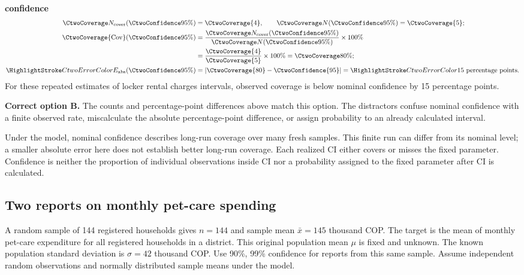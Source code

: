 \textbf{ confidence}\nopagebreak[4]
\begin{align*}
\CtwoCoverCount(\CtwoConfidence{95\%})&=\CtwoCoverage{4},
\qquad\CtwoTotalCount(\CtwoConfidence{95\%})=\CtwoCoverage{5};\\
\CtwoCoverage{\mathrm{Cov}}(\CtwoConfidence{95\%})
&=\frac{\CtwoCoverCount(\CtwoConfidence{95\%})}{\CtwoTotalCount(\CtwoConfidence{95\%})}\times100\%
\\
&=\frac{\CtwoCoverage{4}}{\CtwoCoverage{5}}\times100\%=\CtwoCoverage{80\%};\\
\CtwoError{E_{\rm abs}}(\CtwoConfidence{95\%})
&=\left|\CtwoCoverage{80}-\CtwoConfidence{95}\right|=\CtwoError{15}\ \text{percentage points}.
\end{align*}
For these repeated estimates of locker rental charges intervals, observed coverage is below nominal confidence by 15 percentage points.

\textbf{Correct option B.} The counts and percentage-point differences above match this option. The distractors confuse nominal confidence with a finite observed rate, miscalculate the absolute percentage-point difference, or assign probability to an already calculated interval.

Under the model, nominal confidence describes long-run coverage over many fresh samples. This finite run can differ from its nominal level; a smaller absolute error here does not establish better long-run coverage. Each realized $\mathrm{CI}$ either covers or misses the fixed parameter. Confidence is neither the proportion of individual observations inside $\mathrm{CI}$ nor a probability assigned to the fixed parameter after $\mathrm{CI}$ is calculated.
\par\nopagebreak[4]
\par\vspace{3mm}
\clearpage
\subsection{Two reports on monthly pet-care spending}
\label{prob:c2-2}

A random sample of 144 registered households gives $n=144$ and sample mean $\bar{x}=145$ thousand COP. The target is the mean of monthly pet-care expenditure for all registered households in a district. This original population mean $\mu$ is fixed and unknown. The known population standard deviation is $\sigma=42$ thousand COP. Use 90\%, 99\% confidence for reports from this same sample. Assume independent random observations and normally distributed sample means under the model.

